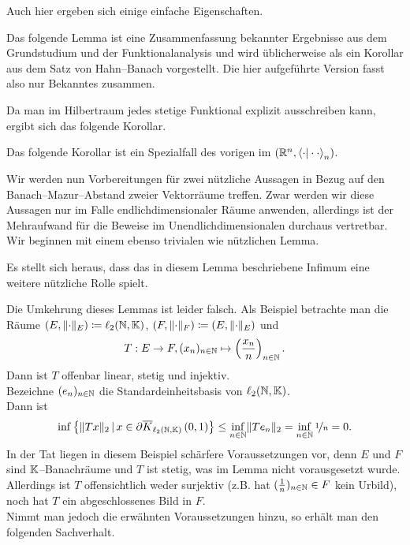 \documentclass[a4paper]{report}
\numberwithin[\roman]{equation}{sat}
\begin{document}

\parag
Auch hier ergeben sich einige einfache Eigenschaften.




\parag
Das folgende Lemma ist eine Zusammenfassung bekannter Ergebnisse aus dem
Grundstudium und der Funktionalanalysis und wird üblicherweise als ein
Korollar aus dem Satz von Hahn--Banach vorgestellt. Die hier aufgeführte
Version fasst also nur Bekanntes zusammen.


\parag
Da man im Hilbertraum jedes stetige Funktional explizit ausschreiben kann,
ergibt sich das folgende Korollar.


\parag
Das folgende Korollar ist ein Spezialfall des vorigen im
$(\mathbb{R}^n, \left\langle \cdot |\cdot\cdot\right\rangle_n)$.


\parag
Wir werden nun Vorbereitungen für zwei nützliche Aussagen in Bezug auf den
Banach--Mazur--Abstand zweier Vektorräume treffen.
Zwar werden wir diese Aussagen nur im Falle endlichdimensionaler Räume anwenden, allerdings ist der
Mehraufwand für die Beweise im Unendlichdimensionalen durchaus vertretbar.\\
Wir beginnen mit einem ebenso trivialen wie nützlichen Lemma.



Es stellt sich heraus, dass das in diesem Lemma beschriebene Infimum eine
weitere nützliche Rolle spielt.

Die Umkehrung dieses Lemmas ist leider falsch.
Als Beispiel betrachte man die Räume
$(E,\lVert\cdot\rVert_E)\coloneqq \ell_2(\mathbb{N},\mathbb{K})$, $(F,\lVert\cdot\rVert_F)\coloneqq (E,\lVert\cdot\rVert_E)$ und
\[T:E\rightarrow F, (x_{n})_{n \in \mathbb{N}} \mapsto \left(\frac{x_n}n\right)_{n\in \mathbb{N}}
\text.\]
Dann ist $T$ offenbar linear, stetig und injektiv.\\
Bezeichne $(e_n)_{n\in \mathbb{N}}$ die Standardeinheitsbasis von $\ell_2(\mathbb{N}, \mathbb{K})$.\\
Dann ist
\begin{align*}\inf\left\{\lVert T x\rVert_2\,|\,x \in \partial \overline K_{\ell_2(\mathbb{N}, \mathbb{K})}\left(0, 1\right)\right\}
\le\inf_{n \in \mathbb{N}}\lVert Te_n\rVert_2=\inf_{n \in \mathbb{N}}\nicefrac 1n=0\text.
\end{align*}
In der Tat liegen in diesem Beispiel schärfere Voraussetzungen vor, denn $E$
und $F$ sind $\mathbb{K}$--Banachräume und $T$ ist stetig, was im Lemma nicht
vorausgesetzt wurde. Allerdings ist $T$ offensichtlich weder surjektiv
(z.B. hat $(\frac 1 n)_{n \in \mathbb{N}} \in F$ kein Urbild), noch hat $T$ ein
abgeschlossenes Bild in $F$.\\
Nimmt man jedoch die erwähnten Voraussetzungen hinzu, so erhält man den
folgenden Sachverhalt.
\end{document}
